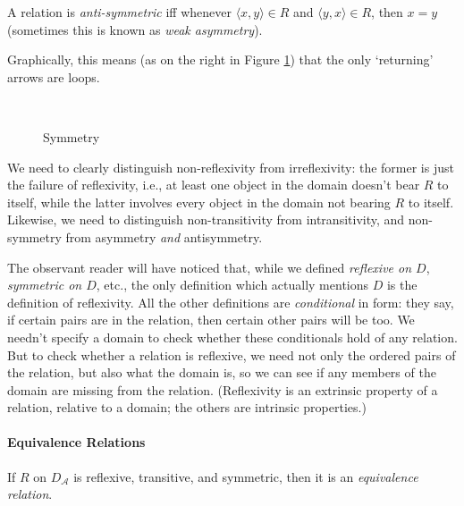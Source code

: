 \begin{definition}
	A relation is \emph{anti-symmetric} iff whenever $\langle x,y\rangle \in R$ and $\langle y,x\rangle \in R$, then $x=y$ (sometimes this is known as \emph{weak asymmetry}).
\end{definition} Graphically, this means (as on the right in Figure \ref{ftwo}) that the only `returning' arrows are loops.

\begin{figure}
\begin{center}
	~{\qquad\qquad}{}
\end{center}	\caption{Symmetry\label{ftwo}}
\end{figure}

We need to clearly distinguish non-reflexivity from irreflexivity: the former is just the failure of reflexivity, i.e., at least one object in the domain doesn't bear $R$ to itself, while the latter involves every object in the domain not bearing $R$ to itself. Likewise, we need to distinguish non-transitivity from intransitivity, and non-symmetry from asymmetry \emph{and} antisymmetry. 

The observant reader will have noticed that, while we defined \emph{reflexive on $D$}, \emph{symmetric on $D$}, etc., the only definition which actually mentions $D$ is the definition of reflexivity. All the other definitions are \emph{conditional} in form: they say, if certain pairs are in the relation, then certain other pairs will be too. We needn't specify a domain to check whether these conditionals hold of any relation. But to check whether a relation is reflexive, we need not only the ordered pairs of the relation, but also what the domain is, so we can see if any members of the domain are missing from the relation. (Reflexivity is an extrinsic property of a relation, relative to a domain; the others are intrinsic properties.)


\paragraph{Equivalence Relations}

\begin{definition}
	If $R$ on $D_{\mathscr{A}}$ is reflexive, transitive, and symmetric, then it is an \emph{equivalence relation}. 
\end{definition}

